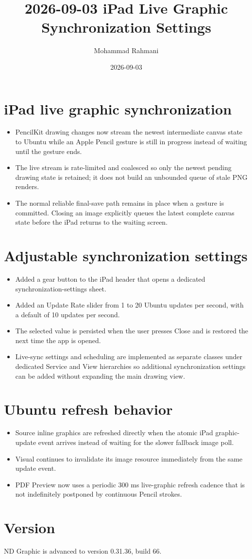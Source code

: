 \documentclass[a4paper]{article}
\title{2026-09-03 iPad Live Graphic Synchronization Settings}
\date{2026-09-03}
\author{Mohammad Rahmani}
\begin{document}
   \maketitle

   \section{iPad live graphic synchronization}
   \begin{itemize}
      \item PencilKit drawing changes now stream the newest intermediate canvas state to Ubuntu while an Apple Pencil gesture is still in progress instead of waiting until the gesture ends.
      \item The live stream is rate-limited and coalesced so only the newest pending drawing state is retained; it does not build an unbounded queue of stale PNG renders.
      \item The normal reliable final-save path remains in place when a gesture is committed. Closing an image explicitly queues the latest complete canvas state before the iPad returns to the waiting screen.
   \end{itemize}

   \section{Adjustable synchronization settings}
   \begin{itemize}
      \item Added a gear button to the iPad header that opens a dedicated synchronization-settings sheet.
      \item Added an Update Rate slider from 1 to 20 Ubuntu updates per second, with a default of 10 updates per second.
      \item The selected value is persisted when the user presses Close and is restored the next time the app is opened.
      \item Live-sync settings and scheduling are implemented as separate classes under dedicated Service and View hierarchies so additional synchronization settings can be added without expanding the main drawing view.
   \end{itemize}

   \section{Ubuntu refresh behavior}
   \begin{itemize}
      \item Source inline graphics are refreshed directly when the atomic iPad graphic-update event arrives instead of waiting for the slower fallback image poll.
      \item Visual continues to invalidate its image resource immediately from the same update event.
      \item PDF Preview now uses a periodic 300 ms live-graphic refresh cadence that is not indefinitely postponed by continuous Pencil strokes.
   \end{itemize}

   \section{Version}
   ND Graphic is advanced to version 0.31.36, build 66.

   
   
\end{document}
